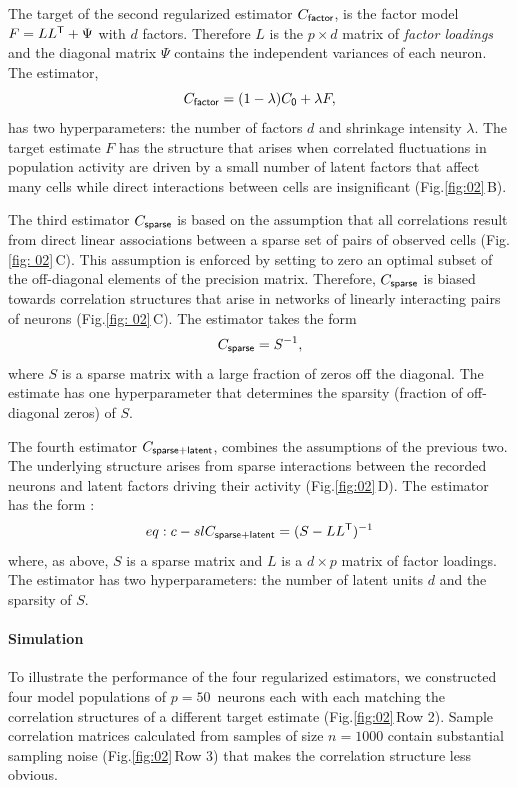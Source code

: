 \documentclass[10pt]{article}
\newcommand{\figref}[2]{Fig.\;\ref{fig:#1}\,#2}
\newcommand{\T}{{\sf T}}
\begin{document}
The target of the second regularized estimator $C_{\sf factor}$, is the factor model $F =  L L^\T + \Psi$ with $d$ factors. Therefore $L$ is the $p\times d$ matrix of \emph{factor loadings} and the diagonal matrix $\Psi$ contains the independent variances of each neuron. The estimator, 
\begin{equation}\label{eq:c-factor}
C_{\sf factor} = (1-\lambda) C_{\sf 0} + \lambda F,
\end{equation}
has two hyperparameters: the number of factors $d$ and shrinkage intensity $\lambda$. The target estimate $F$ has the structure that arises when correlated fluctuations in population activity are driven by a small number of latent factors that affect many cells while direct interactions between cells are insignificant (\figref{02}{B}).   

The third estimator $C_{\sf sparse}$ is based on the assumption that all correlations result from direct linear associations between a sparse set of pairs of observed cells (\figref{ 02}{C}).  This assumption is enforced by setting to zero an optimal subset of the off-diagonal elements of the precision matrix.  Therefore, $C_{\sf sparse}$ is biased towards correlation structures that arise in networks of linearly interacting pairs of neurons (\figref{ 02}{C}). The estimator takes the form
\begin{equation}\label{eq:c-sparse}
C_{\sf sparse} = S^{-1},
\end{equation}
where $S$ is a sparse matrix with a large fraction of zeros off the diagonal. The estimate has one hyperparameter that determines the sparsity (fraction of off-diagonal zeros) of $S$.

The fourth estimator $C_{\sf sparse+latent}$, combines the assumptions of the previous two.  The underlying structure arises from sparse interactions between the recorded neurons and latent factors driving their activity (\figref{02}{D}). The estimator has the form \cite{Chandrasekaran:2010,Ma:2013}:
\begin{equation}{eq:c-sl}
C_{\sf sparse+latent} = (S - LL^\T)^{-1}
\end{equation}
where, as above, $S$ is a sparse matrix and $L$ is a $d\times p$ matrix of factor loadings. The estimator has two hyperparameters: the number of latent units $d$ and the sparsity of $S$.

\paragraph{Simulation}
To illustrate the performance of the four regularized estimators, we constructed four model populations of $p=50$~neurons each with each matching the correlation structures of a different target estimate (\figref{02}{Row 2}).  Sample correlation matrices calculated from samples of size $n=1000$ contain substantial sampling noise (\figref{02}{Row 3}) that makes the correlation structure less obvious.
\end{document}
